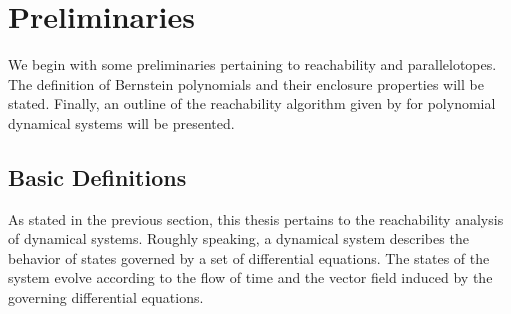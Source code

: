\chapter{Preliminaries}
\label{chap:prelim}

We begin with some preliminaries pertaining to reachability and parallelotopes. The definition of Bernstein polynomials and their enclosure properties will be stated. Finally, an outline of the reachability algorithm given by \cite{dreossi2016parallelotope} for polynomial dynamical systems will be presented.

\section{Basic Definitions}
\label{sec:definitions}

As stated in the previous section, this thesis pertains to the reachability analysis of dynamical systems. Roughly speaking, a dynamical system describes the behavior of states governed by a set of differential equations. The states of the system evolve according to the flow of time and the vector field induced by the governing differential equations.

